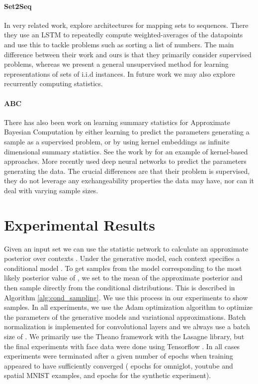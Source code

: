 \documentclass{article} \usepackage{iclr2017_conference,times}
\newcommand{\iid}{i.i.d }
\begin{document}
\paragraph{Set2Seq} In very related work, \citet{set2seq} explore architectures for mapping sets to sequences. There they use an LSTM to repeatedly compute weighted-averages of the datapoints and use this to tackle problems such as sorting a list of numbers. The main difference between their work and ours is that they primarily consider supervised problems, whereas we present a general unsupervised method for learning representations of sets of \iid instances. In future work we may also explore recurrently computing statistics.

\paragraph{ABC}
There has also been work on learning summary statistics for Approximate Bayesian Computation by either learning to predict the parameters generating a sample as a supervised problem, or by using kernel embeddings as infinite dimensional summary statistics. See the work by \citet{kernel_bayes} for an example of kernel-based approaches. More recently \citet{deep_summary_statistics} used deep neural networks to predict the parameters generating the data. The crucial differences are that their problem is supervised, they do not leverage any exchangeability properties the data may have, nor can it deal with varying sample sizes.
\vspace{-0.5em}
\section{Experimental Results}
Given an input set  we can use the statistic network to calculate an approximate posterior over contexts . Under the generative model, each context  specifies a conditional model . To get samples from the model corresponding to the most likely posterior value of , we set  to the mean of the approximate posterior and then sample directly from the conditional distributions. This is described in Algorithm \ref{alg:cond_sampling}. We use this process in our experiments to show samples. In all experiments, we use the Adam optimization algorithm \citep{adam} to optimize the parameters of the generative models and variational approximations. Batch normalization \citep{batchnorm} is implemented for convolutional layers and we always use a batch size of . We primarily use the Theano \citep{theano} framework with the Lasagne \citep{lasagne} library, but the final experiments with face data were done using Tensorflow \citep{tensorflow}. In all cases experiments were terminated after a given number of epochs when training appeared to have sufficiently converged ( epochs for omniglot, youtube and spatial MNIST examples, and  epochs for the synthetic experiment).
\end{document}
